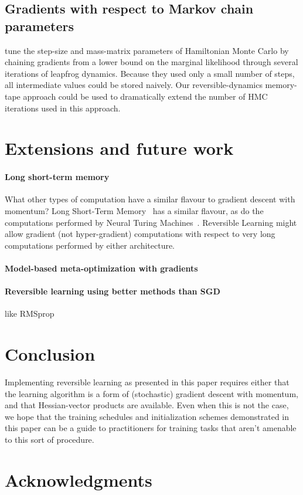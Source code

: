 \documentclass{article}
\begin{document}
\subsection{Gradients with respect to Markov chain parameters}
\citet{Bridging14} tune the step-size and mass-matrix parameters of Hamiltonian Monte Carlo by chaining gradients from a lower bound on the marginal likelihood through several iterations of leapfrog dynamics.
Because they used only a small number of steps, all intermediate values could be stored naively.
Our reversible-dynamics memory-tape approach could be used to dramatically extend the number of HMC iterations used in this approach.

\section{Extensions and future work}

\paragraph{Long short-term memory}
What other types of computation have a similar flavour to gradient descent with momentum?
Long Short-Term Memory~\citep{hochreiter1997long} has a similar flavour, as do the computations performed by Neural Turing Machines~\citep{graves2014neural}.
Reversible Learning might allow gradient (not hyper-gradient) computations with respect to very long computations performed by either architecture.

\paragraph{Model-based meta-optimization with gradients}

\paragraph{Reversible learning using better methods than SGD}

like RMSprop

\section{Conclusion}

Implementing reversible learning as presented in this paper requires either that the learning algorithm is a form of (stochastic) gradient descent with momentum, and that Hessian-vector products are available.
Even when this is not the case, we hope that the training schedules and initialization schemes demonstrated in this paper can be a guide to practitioners for training tasks that aren't amenable to this sort of procedure.

\section*{Acknowledgments} 




\end{document}
